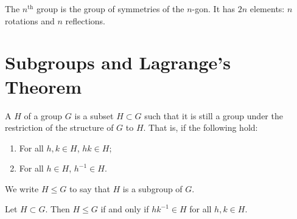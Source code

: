 \documentclass[12pt]{report}
\begin{document}
\begin{example}
  The \(n^{\text{th}}\)  group is the group of symmetries of the \(n\)-gon.
  It has \(2n\) elements: \(n\) rotations and \(n\) reflections.

  \begin{centre}
  \end{centre}
\end{example}



\section{Subgroups and Lagrange's Theorem}

\begin{definition}\label{def:group-theory:subgroup}
  A  \(H\) of a group \(G\) is a subset \(H \subset G\) such that it is still a group under the restriction of the structure of \(G\) to \(H\).
  That is, if the following hold:
  \begin{enumerate}
  \item For all \(h, k \in H\), \(hk \in H\);
  \item For all \(h \in H\), \(h^{-1} \in H\).
  \end{enumerate}


  We write \(H \leq G\) to say that \(H\) is a subgroup of \(G\).
\end{definition}


\begin{lemma}
  \label{lem:group-theory:subgroup-criterion}
  Let \(H \subset G\).
  Then \(H \leq G\) if and only if \(hk^{-1} \in H\) for all \(h,k \in H\).
\end{lemma}
\end{document}
